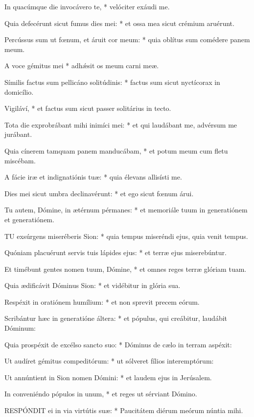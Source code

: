 In quacúmque die invocávero te, * velóciter exáudi me.

Quia defecérunt sicut fumus dies mei: * et ossa mea sicut crémium aruérunt.

Percússus sum ut fœnum, et áruit cor meum: * quia oblítus sum comédere panem meum.

A voce gémitus mei * adhǽsit os meum carni meæ.

Símilis factus sum pellicáno solitúdinis: * factus sum sicut nyctícorax in domicílio.

Vigiláví, * et factus sum sicut passer solitárius in tecto.

Tota die exprobrábant mihi inimíci mei: * et qui laudábant me, advérsum me jurábant.

Quia cínerem tamquam panem manducábam, * et potum meum cum fletu miscébam.

A fácie iræ et indignatiónis tuæ: * quia élevans allisísti me.

Dies mei sicut umbra declinavérunt: * et ego sicut fœnum árui.

Tu autem, Dómine, in ætérnum pérmanes: * et memoriále tuum in generatiónem et generatiónem.


\lettrine[lines=2]{T}{U} exsúrgens miseréberis Sion: * quia tempus miseréndi ejus, quia venit tempus.

Quóniam placuérunt servis tuis lápides ejus: * et terræ ejus miserebúntur.

Et timébunt gentes nomen tuum, Dómine, * et omnes reges terræ glóriam tuam.

Quia ædificávit Dóminus Sion: * et vidébitur in glória sua.

Respéxit in oratiónem humílium: * et non sprevit precem eórum.

Scribántur hæc in generatióne áltera: * et pópulus, qui creábitur, laudábit Dóminum:

Quia prospéxit de excélso sancto suo: * Dóminus de cælo in terram aspéxit:

Ut audíret gémitus compeditórum: * ut sólveret fílios interemptórum:

Ut annúntient in Sion nomen Dómini: * et laudem ejus in Jerúsalem.

In conveniéndo pópulos in unum, * et reges ut sérviant Dómino.


\lettrine[lines=2]{R}{ESPÓNDIT} ei in via virtútis suæ: * Paucitátem diérum meórum núntia mihi.

